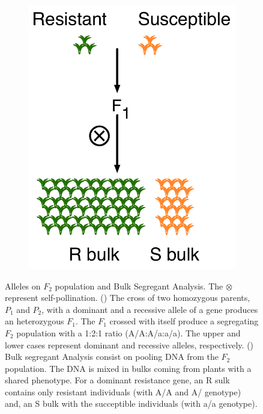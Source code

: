 \begin{figure}
\begin{subfigure}{0.5\textwidth}
   \includegraphics[height=0.3\textheight]{Yr15/Figures/BSA.pdf}
  \end{subfigure}
   \caption[Alleles on $F_2$ population and Bulk Segregant Analysis.]{Alleles on $F_2$ population and Bulk Segregant Analysis. The $\otimes$ represent self-pollination. () The cross of two homozygous parents, $P_{1}$ and $P_{2}$, with a dominant and a recessive allele of a gene produces an heterozygous $F_{1}$. The $F_{1}$ crossed with itself produce a segregating $F_{2}$ population with a 1:2:1 ratio (A/A:A/a:a/a). The upper and lower cases represent dominant and recessive alleles, respectively. () Bulk segregant Analysis consist on pooling DNA from the $F_{2}$ population. The DNA is mixed in bulks coming from plants with a shared phenotype. For a dominant resistance gene, an R sulk contains only resistant individuals (with A/A and A/ genotype) and, an S bulk with the succeptible individuals (with a/a genotype). } 
  
\end{figure}

